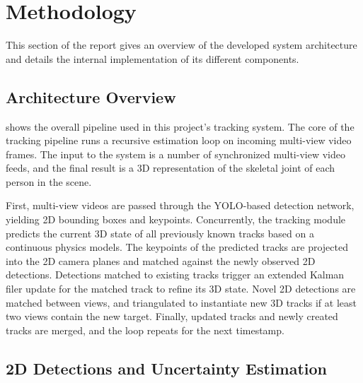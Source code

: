 


\section{Methodology} \label{methodology}

This section of the report gives an overview of the developed system architecture and details the internal implementation of its different components.


\subsection{Architecture Overview} \label{arch-overview} \label{arch}

 shows the overall pipeline used in this project's tracking system. The core of the tracking pipeline runs a recursive estimation loop on incoming multi-view video frames. The input to the system is a number of synchronized multi-view video feeds, and the final result is a 3D representation of the skeletal joint of each person in the scene.

First, multi-view videos are passed through the YOLO-based detection network, yielding 2D bounding boxes and keypoints. Concurrently, the tracking module predicts the current 3D state of all previously known tracks based on a continuous physics models. The keypoints of the predicted tracks are projected into the 2D camera planes and matched against the newly observed 2D detections. Detections matched to existing tracks trigger an extended Kalman filer update for the matched track to refine its 3D state. Novel 2D detections are matched between views, and triangulated to instantiate new 3D tracks if at least two views contain the new target. Finally, updated tracks and newly created tracks are merged, and the loop repeats for the next timestamp.


\subsection{2D Detections and Uncertainty Estimation} \label{arch-detect}

